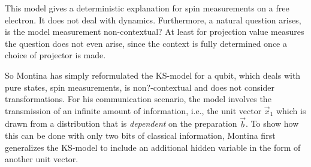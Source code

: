 \documentclass[12pt,draft]{article}
\theoremstyle{definition}
\theoremstyle{plain}
\begin{document}
{        This model gives a deterministic explanation for
        spin measurements on a free electron. It does not
        deal with dynamics. Furthermore, a natural question
        arises, is the model measurement non-contextual? At
        least for projection value measures the question
        does not even arise, since the context is fully
        determined once a choice of projector is made.
    }

    So Montina has simply reformulated the KS-model for a
    qubit, which deals with pure states, spin measurements,
    is non?-contextual and does not consider
    transformations. For his communication scenario, the
    model involves the transmission of an infinite amount of
    information, i.e., the unit vector $\vec x_1$ which is
    drawn from a distribution that is \textit{dependent} on
    the preparation $\vec b$. To show how this can be done
    with only two bits of classical information, Montina
    first generalizes the KS-model to include an additional
    hidden variable in the form of another unit vector.
\end{document}
